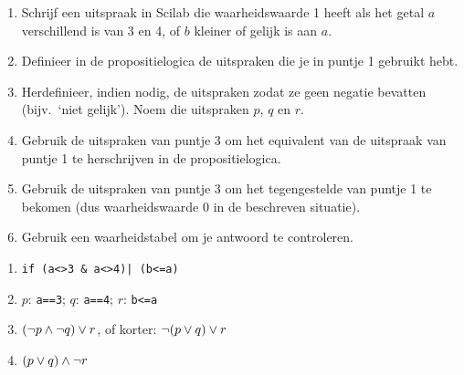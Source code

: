 \begin{oef}
\begin{enumerate}
\item  Schrijf een uitspraak in Scilab die waarheidswaarde 1 heeft als het getal $a$ verschillend is van 3 en 4, of $b$ kleiner of gelijk is aan $a$.
\item Definieer	 in	de	propositielogica	de 	uitspraken	die	je	in	puntje	1 gebruikt	hebt.
\item Herdefinieer,	indien	nodig,	de	 uitspraken	zodat	ze	 geen	negatie 	bevatten	(bijv.\ `niet	gelijk'). Noem die uitspraken $p$, $q$ en $r$.
\item Gebruik	de 	uitspraken	van	puntje	3	om	het	equivalent	van	de uitspraak	van	
puntje	1	te	herschrijven in	de 	propositielogica.
\item Gebruik	de	 uitspraken	van	puntje	3	om	het	tegengestelde	van	puntje	1	te	
bekomen	(dus	waarheidswaarde	0	in	de 	beschreven	situatie).
\item Gebruik	een	waarheidstabel	 om	je	antwoord	te	controleren.
\end{enumerate}
\begin{opl}
\begin{enumerate}
\item \verb+if (a<>3 & a<>4)| (b<=a)+
\item $p$: \texttt{a==3}; $q$: \texttt{a==4}; $r$: \texttt{b<=a}
\item $(\neg p \wedge \neg q)\vee r$, of korter: $\neg(p \vee q) \vee r$
\item $(p\vee q)\wedge \neg r$
\end{enumerate}
\end{opl}
\end{oef}


